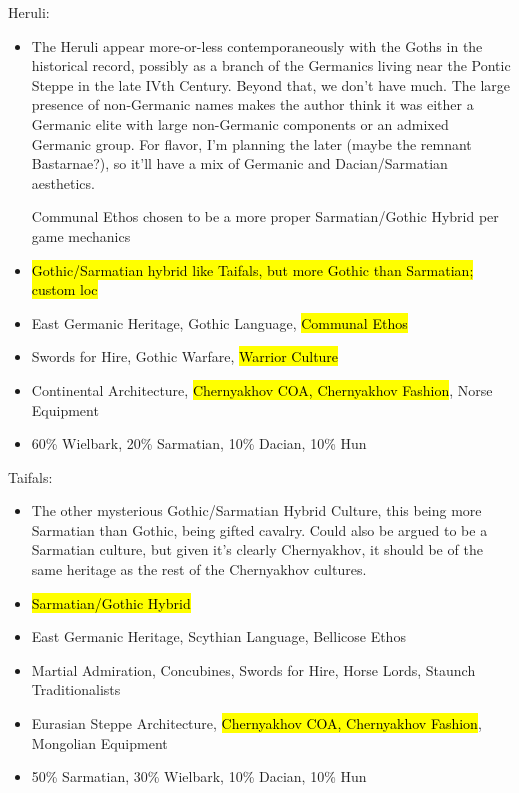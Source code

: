 \documentclass{article}
\begin{document}
	Heruli:
	\begin{itemize}
		\item The Heruli appear more-or-less contemporaneously with the Goths in the historical record, possibly as a branch of the Germanics living near the Pontic Steppe in the late IVth Century.
		Beyond that, we don’t have much.
		The large presence of non-Germanic names \cite{OdoacerGermanOrHun} makes the author think it was either a Germanic elite with large non-Germanic components or an admixed Germanic group.
		For flavor, I’m planning the later (maybe the remnant Bastarnae?), so it’ll have a mix of Germanic and Dacian/Sarmatian aesthetics.
		
		Communal Ethos chosen to be a more proper Sarmatian/Gothic Hybrid per game mechanics
		\item \hl{Gothic/Sarmatian hybrid like Taifals, but more Gothic than Sarmatian; custom loc}
		\item East Germanic Heritage, Gothic Language, \hl{Communal Ethos}
		\item Swords for Hire, Gothic Warfare, \hl{Warrior Culture}
		\item Continental Architecture, \hl{Chernyakhov COA, Chernyakhov Fashion}, Norse Equipment
		\item 60\% Wielbark, 20\% Sarmatian, 10\% Dacian, 10\% Hun
	\end{itemize}
	
	Taifals:
	\begin{itemize}
		\item The other mysterious Gothic/Sarmatian Hybrid Culture, this being more Sarmatian than Gothic, being gifted cavalry.
		Could also be argued to be a Sarmatian culture, but given it's clearly Chernyakhov, it should be of the same heritage as the rest of the Chernyakhov cultures.
		\item \hl{Sarmatian/Gothic Hybrid}
		\item East Germanic Heritage, Scythian Language, Bellicose Ethos
		\item Martial Admiration, Concubines, Swords for Hire, Horse Lords, Staunch Traditionalists
		\item Eurasian Steppe Architecture, \hl{Chernyakhov COA, Chernyakhov Fashion}, Mongolian Equipment
		\item 50\% Sarmatian, 30\% Wielbark, 10\% Dacian, 10\% Hun
	\end{itemize}
	
\end{document}
